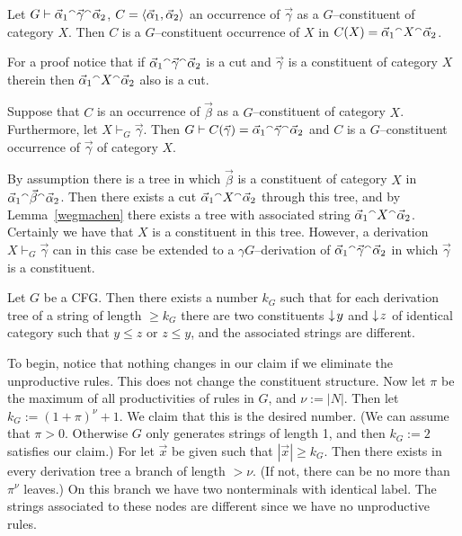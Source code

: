 \begin{lem}
Let $G \vdash \vec{\alpha}_1 {^{\smallfrown}} \vec{\gamma} {^{\smallfrown}} \vec{\alpha}_2$, 
$C = \langle \vec{\alpha}_1, \vec{\alpha}_2\rangle$ an occurrence 
of $\vec{\gamma}$ as a $G$--constituent of category $X$. Then $C$ is a
$G$--constituent occurrence of $X$ in $C(X) = \vec{\alpha}_1 \conc X \conc %
\vec{\alpha}_2$.
\end{lem}
For a proof notice that if $\vec{\alpha}_1 {^{\smallfrown}}
\vec{\gamma} {^{\smallfrown}} \vec{\alpha}_2$ is a cut and
$\vec{\gamma}$ is a constituent of category $X$ therein then
$\vec{\alpha}_1 {^{\smallfrown}} X {^{\smallfrown}} \vec{\alpha}_2$ also is a cut.
\begin{thm}
Suppose that $C$ is an occurrence of $\vec{\beta}$ as
a $G$--constituent of category $X$. Furthermore, let
$X \vdash_G \vec{\gamma}$. Then $G \vdash C(\vec{\gamma}) =
\vec{\alpha}_1 {^{\smallfrown}} \vec{\gamma} {^{\smallfrown}} \vec{\alpha}_2$
and $C$ is a $G$--constituent occurrence of $\vec{\gamma}$ 
of category $X$.
\end{thm}
\proofbeg
By assumption there is a tree in which $\vec{\beta}$
is a constituent of category $X$ in $\vec{\alpha}_1 \conc \vec{\beta} %
\conc \vec{\alpha}_2$.  Then there exists a cut $\vec{\alpha}_1 {^{\smallfrown}} X
{^{\smallfrown}} \vec{\alpha}_2$ through this tree, and by
Lemma~\ref{wegmachen} there exists a tree with associated
string $\vec{\alpha}_1 {^{\smallfrown}} X {^{\smallfrown}} \vec{\alpha}_2$.
Certainly we have that $X$ is a constituent in this tree.
However,  a derivation $X \vdash_G \vec{\gamma}$ can in
this case be extended to a $\gamma G$--derivation of
$\vec{\alpha}_1 {^{\smallfrown}} \vec{\gamma}{^{\smallfrown}} \vec{\alpha}_2$
in which $\vec{\gamma}$ is a constituent.
\proofend
\begin{lem}
Let $G$ be a CFG. Then there exists a number $k_G$ such that 
for each derivation tree of a string of length $\geq k_G$ there 
are two constituents ${\downarrow\! y}$ and ${\downarrow\! z}$ of identical 
category such that $y \leq z$ or $z \leq y$,
and the associated strings are different.
\end{lem}
\proofbeg
To begin, notice that nothing changes in our claim if we
eliminate the unproductive rules. This does not change the
constituent structure. Now let $\pi$ be the maximum of all
productivities of rules in $G$, and $\nu := |N|$. Then
let $k_G := (1 + \pi)^{\nu} + 1$. We claim that this is the
desired number.  (We can assume that $\pi > 0$. Otherwise
$G$ only generates strings of length 1, and then $k_G := 2$
satisfies our claim.) For let $\vec{x}$ be given such that
$|\vec{x}| \geq k_G$.  Then there exists in every derivation
tree a branch of length $> \nu$. (If not, there can be no more
than $\pi^{\nu}$ leaves.) On this branch we have two nonterminals
with identical label. The strings associated to these
nodes are different since we have no unproductive rules.
\proofend

